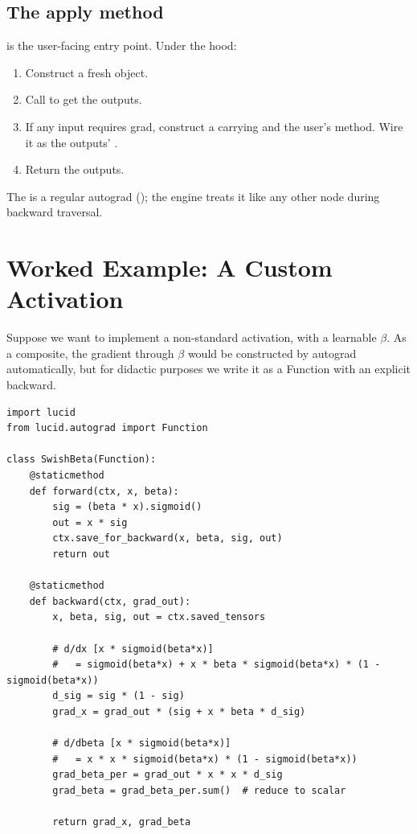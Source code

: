 \subsection{The apply method}
\label{ssec:custom_functions:apply}

 is the user-facing entry point. Under
the hood:

\begin{enumerate}
  \item Construct a fresh  object.
  \item Call  to get the outputs.
  \item If any input requires grad, construct a
     carrying  and the user's
     method. Wire it as the outputs'
    .
  \item Return the outputs.
\end{enumerate}

The  is a regular autograd 
(); the engine treats it like any
other node during backward traversal.

\section{Worked Example: A Custom Activation}
\label{sec:custom_functions:custom_activation}

Suppose we want to implement a non-standard activation,
 with a learnable
$\beta$. As a composite, the gradient through $\beta$ would be
constructed by autograd automatically, but for didactic purposes
we write it as a Function with an explicit backward.

\begin{lstlisting}[style=lucid,language=LucidPython]
import lucid
from lucid.autograd import Function

class SwishBeta(Function):
    @staticmethod
    def forward(ctx, x, beta):
        sig = (beta * x).sigmoid()
        out = x * sig
        ctx.save_for_backward(x, beta, sig, out)
        return out

    @staticmethod
    def backward(ctx, grad_out):
        x, beta, sig, out = ctx.saved_tensors

        # d/dx [x * sigmoid(beta*x)]
        #   = sigmoid(beta*x) + x * beta * sigmoid(beta*x) * (1 - sigmoid(beta*x))
        d_sig = sig * (1 - sig)
        grad_x = grad_out * (sig + x * beta * d_sig)

        # d/dbeta [x * sigmoid(beta*x)]
        #   = x * x * sigmoid(beta*x) * (1 - sigmoid(beta*x))
        grad_beta_per = grad_out * x * x * d_sig
        grad_beta = grad_beta_per.sum()  # reduce to scalar

        return grad_x, grad_beta
\end{lstlisting}

